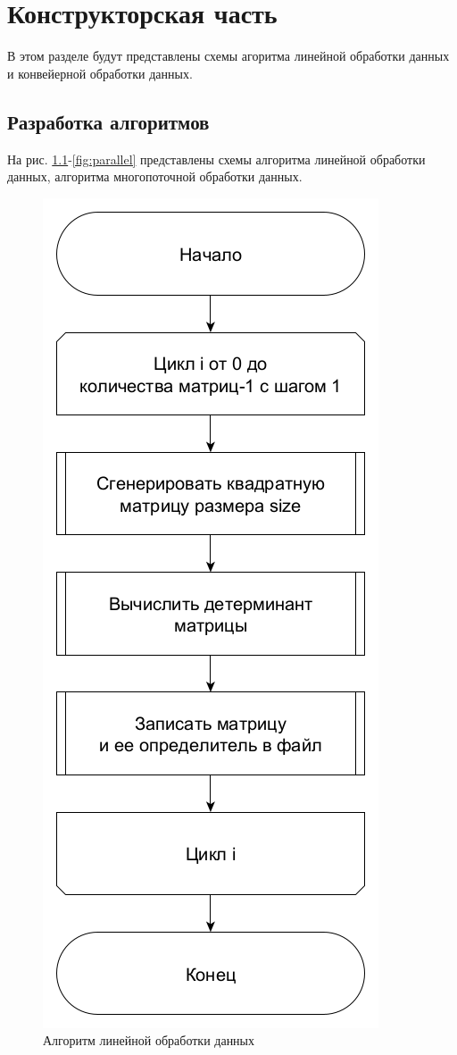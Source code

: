 \chapter{Конструкторская часть}
\hspace{\parindent}В этом разделе будут представлены схемы агоритма линейной обработки данных и конвейерной обработки данных.

\section{Разработка алгоритмов}
\hspace{\parindent}На рис. \ref{fig:linear}-\ref{fig:parallel} представлены схемы алгоритма линейной обработки данных, алгоритма многопоточной обработки данных.

\begin{figure}[h]
	\centering
    \includegraphics[height=0.6\textheight]{img/linear.png}
    \caption{Алгоритм линейной обработки данных}
    \label{fig:linear}
\end{figure}
